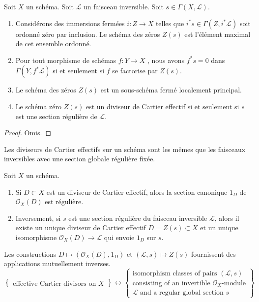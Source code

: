 \begin{lemma}
\label{lemma-zero-scheme}
Soit  $X$  un schéma. Soit  $\mathcal{L}$  un faisceau inversible. Soit
 $s \in \Gamma(X, \mathcal{L})$.
\begin{enumerate}
\item Considérons des immersions fermées  $i : Z \to X$  telles que  $i^*s \in \Gamma(Z, i^*\mathcal{L})$  soit
ordonné zéro par inclusion. Le schéma des zéros  $Z(s)$  est l'élément maximal
de cet ensemble ordonné.
\item Pour tout morphisme de schémas  $f : Y \to X$ , nous avons  $f^*s = 0$  dans
 $\Gamma(Y, f^*\mathcal{L})$  si et seulement si  $f$  se factorise par  $Z(s)$.
\item Le schéma des zéros  $Z(s)$  est un sous-schéma fermé localement principal.
\item Le schéma zéro  $Z(s)$  est un diviseur de Cartier effectif si et seulement si
 $s$  est une section régulière de  $\mathcal{L}$.
\end{enumerate}
\end{lemma}

\begin{proof}
Omis.
\end{proof}

\begin{lemma}
\label{lemma-characterize-OD}
\begin{slogan}
Les diviseurs de Cartier effectifs sur un schéma sont les mêmes que les faisceaux
inversibles avec une section globale régulière fixée.
\end{slogan}
Soit  $X$  un schéma.
\begin{enumerate}
\item Si  $D \subset X$  est un diviseur de Cartier effectif, alors la section canonique
 $1_D$  de  $\mathcal{O}_X(D)$  est régulière.
\item Inversement, si  $s$  est une section régulière du faisceau inversible
 $\mathcal{L}$, alors il existe un unique diviseur de Cartier effectif  $D = Z(s) \subset X$ 
et un unique isomorphisme  $\mathcal{O}_X(D) \to \mathcal{L}$  qui envoie  $1_D$  sur  $s$.
\end{enumerate}
Les constructions  $D \mapsto (\mathcal{O}_X(D), 1_D)$  et  $(\mathcal{L}, s) \mapsto Z(s)$  fournissent des applications
mutuellement inverses.
$$
\left\{
\begin{matrix}
\text{effective Cartier divisors on }X
\end{matrix}
\right\}
\leftrightarrow
\left\{
\begin{matrix}
\text{isomorphism classes of pairs }(\mathcal{L}, s)\\
\text{consisting of an invertible }
\mathcal{O}_X\text{-module}\\
\mathcal{L}\text{ and a regular global section }s
\end{matrix}
\right\}
$$
\end{lemma}

